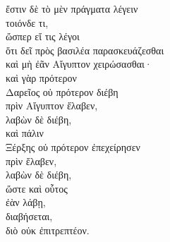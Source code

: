 
{\large
\begin{greek}
\noindent ἔστιν δὲ τὸ μὲν πράγματα λέγειν \\
\tabto{2em} τοιόνδε τι, \\
\tabto{3em} ὥσπερ εἴ τις λέγοι \\
\tabto{4em} ὅτι δεῖ πρὸς βασιλέα παρασκευάζεσθαι \\
\tabto{4em} καὶ μὴ ἐᾶν Αἴγυπτον χειρώσασθαι· \\
καὶ γὰρ πρότερον \\
\tabto{2em} Δαρεῖος οὐ πρότερον διέβη \\
\tabto{3em} πρὶν Αἴγυπτον ἔλαβεν, \\
\tabto{4em} λαβὼν δὲ διέβη, \\
καὶ πάλιν \\
\tabto{2em} Ξέρξης οὐ πρότερον ἐπεχείρησεν \\
\tabto{3em} πρὶν ἔλαβεν, \\
\tabto{4em} λαβὼν δὲ διέβη, \\
ὥστε καὶ οὗτος \\
\tabto{2em} ἐὰν λάβῃ, \\
\tabto{3em} διαβήσεται, \\
διὸ οὐκ ἐπιτρεπτέον.\\

\end{greek}
}

